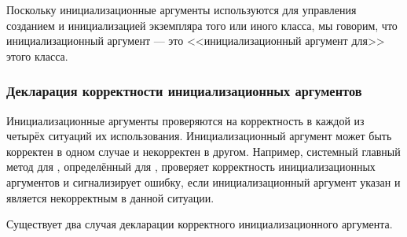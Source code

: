 Поскольку инициализационные аргументы используются для управления созданием и
инициализацией экземпляра того или иного класса, мы говорим, что
инициализационный аргумент --- это <<инициализационный аргумент для>> этого
класса.

\subsubsection{Декларация корректности инициализационных аргументов}
\label{Declaring-the-Validity-of-Initialization-Arguments-SECTION}

Инициализационные аргументы проверяются на корректность в каждой из четырёх
ситуаций их использования. Инициализационный аргумент может быть корректен в
одном случае и некорректен в другом. Например, системный главный метод для
, определённый для , проверяет
корректность инициализационных аргументов и сигнализирует ошибку, если
инициализационный аргумент указан и является некорректным в данной ситуации.

Существует два случая декларации корректного инициализационного аргумента.

